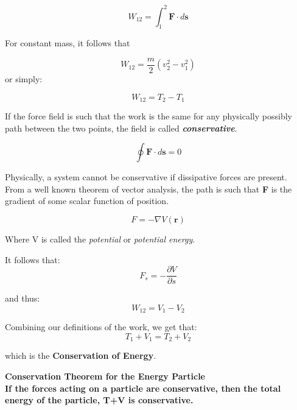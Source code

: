 \documentclass{article}
\newcommand{\bb}[1]{\begin{tcolorbox}
  \textbf{#1}
\end{tcolorbox}}
\begin{document}
\begin{equation*}
    W_{12} = \int_{1}^{2} \textbf{F} \cdot d\textbf{s}
\end{equation*}

\newpage
For constant mass, it follows that

\begin{equation*}
    W_{12} = \frac{m}{2}(v_2^2 - v_1^2)
\end{equation*}
or simply:

\begin{equation*}
    W_{12} = T_2 - T_1
\end{equation*}

If the force field is such that the work is the same for any physically possibly path between the two points, the field is called \textbf{\textit{conservative}}.


\begin{equation*}
    \oint\textbf{F} \cdot d\textbf{s} = 0
\end{equation*}

Physically, a system cannot be conservative if dissipative forces are present.
\\

From a well known theorem of vector analysis, the path is such that \textbf{F} is the gradient of some scalar function of position.

\begin{equation*}
    F = -\nabla V(\textbf{r})
\end{equation*}

Where V is called the \textit{potential} or \textit{potential energy}.

It follows that:
\\
\begin{equation*}
    F_s = -\frac{\partial V}{\partial s}
\end{equation*}

and thus:
\\
\begin{equation*}
    W_{12} = V_1-V_2
\end{equation*}

Combining our definitions of the work, we get that:
\\
\begin{equation}
    T_1 +V_1 = T_2 +V_2
\end{equation}

which is the \textbf{Conservation of Energy}.



\bb{\textbf{Conservation Theorem for the Energy Particle}\\\newline If the forces acting on a particle are conservative, then the total energy of the particle, T+V is conservative.}
\end{document}

